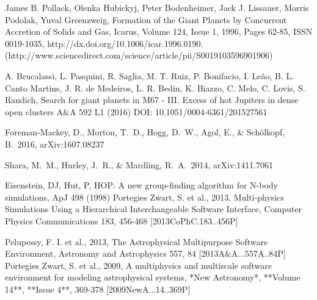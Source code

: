 \documentclass[12pt]{article}
\begin{document}
\begin{thebibliography}{9}

James B. Pollack, Olenka Hubickyj, Peter Bodenheimer, Jack J. Lissauer, Morris Podolak, Yuval Greenzweig, Formation of the Giant Planets by Concurrent Accretion of Solids and Gas, Icarus, Volume 124, Issue 1, 1996, Pages 62-85, ISSN 0019-1035, http://dx.doi.org/10.1006/icar.1996.0190.
(http://www.sciencedirect.com/science/article/pii/S0019103596901906)

A.  Brucalassi, L.  Pasquini, R.  Saglia, M. T.  Ruiz, P.  Bonifacio, I.  Leão, B. L.  Canto Martins, J. R.  de Medeiros, L. R.  Bedin, K.  Biazzo, C.  Melo, C.  Lovis, S.  Randich,
Search for giant planets in M67 - III. Excess of hot Jupiters in dense open clusters
A\&A 592 L1 (2016)
DOI: 10.1051/0004-6361/201527561

Foreman-Mackey, D., Morton, T.~D., Hogg, D.~W., Agol, E., \& Sch{\"o}lkopf, B.\ 2016, arXiv:1607.08237 

 Shara, M.~M., Hurley, J.~R., \& Mardling, R.~A.\ 2014, arXiv:1411.7061 

 Eisenstein, DJ, Hut, P, HOP: A new group-finding algorithm for N-body simulations, ApJ 498 (1998)
 Portegies Zwart, S. et al., 2013, Multi-physics Simulations Using a Hierarchical Interchangeable Software Interface, Computer Physics Communications 183, 456-468 [2013CoPhC.183..456P]
		
 Pelupessy, F. I. et al., 2013, The Astrophysical Multipurpose Software Environment, Astronomy and Astrophysics 557, 84 [2013A\&A...557A..84P]
 Portegies Zwart, S. et al., 2009, A multiphysics and multiscale software environment for modeling astrophysical systems, *New Astronomy*, **Volume 14**, **Issue 4**, 369-378 [2009NewA...14..369P]

\end{thebibliography}
\end{document}
